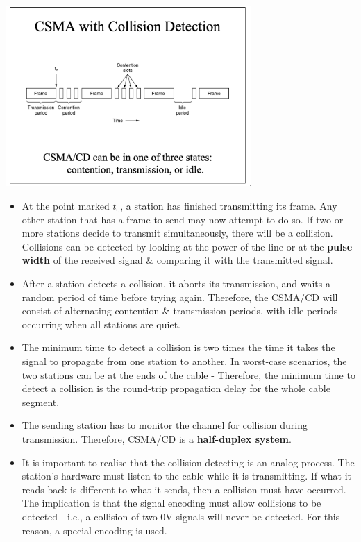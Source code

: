 \documentclass[11pt]{article}
\begin{document}
\begin{center}
    \includegraphics[width=0.7\textwidth]{csmawithcd.png}
\end{center}

\begin{itemize}
    \item   At the point marked $t_0$, a station has finished transmitting its frame. 
            Any other station that has a frame to send may now attempt to do so. 
            If two or more stations decide to transmit simultaneously, there will be a collision. 
            Collisions can be detected by looking at the power of the line or at the \textbf{pulse width} of 
            the received signal \& comparing it with the transmitted signal.
    \item   After a station detects a collision, it aborts its transmission, and waits a random period 
            of time before trying again. 
            Therefore, the CSMA/CD will consist of alternating contention \& transmission periods, with 
            idle periods occurring when all stations are quiet.
    \item   The minimum time to detect a collision is two times the time it takes the signal to propagate 
            from one station to another. 
            In worst-case scenarios, the two stations can be at the ends of the cable - Therefore, the 
            minimum time to detect a collision is the round-trip propagation delay for the whole cable 
            segment. 
    \item   The sending station has to monitor the channel for collision during transmission. 
            Therefore, CSMA/CD is a \textbf{half-duplex system}.
    \item   It is important to realise that the collision detecting is an analog process. 
            The station's hardware must listen to the cable while it is transmitting. 
            If what it reads back is different to what it sends, then a collision must have occurred. 
            The implication is that the signal encoding must allow collisions to be detected - i.e., 
            a collision of two 0V signals will never be detected. 
            For this reason, a special encoding is used.
\end{itemize}
\end{document}
